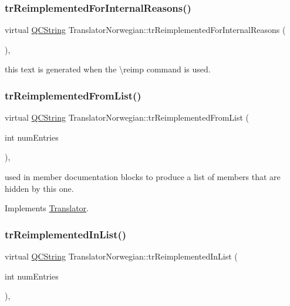 \subsubsection{\texorpdfstring{trReimplementedForInternalReasons()}{trReimplementedForInternalReasons()}}
{\footnotesize\ttfamily virtual \mbox{\hyperlink{class_q_c_string}{Q\+C\+String}} Translator\+Norwegian\+::tr\+Reimplemented\+For\+Internal\+Reasons (\begin{DoxyParamCaption}{ }\end{DoxyParamCaption})\hspace{0.3cm}{\ttfamily [inline]}, {\ttfamily [virtual]}}

this text is generated when the \textbackslash{}reimp command is used. \mbox{\label{class_translator_norwegian_a3698ea1a6022ce90bc1fdfeec9107a38}} 
\subsubsection{\texorpdfstring{trReimplementedFromList()}{trReimplementedFromList()}}
{\footnotesize\ttfamily virtual \mbox{\hyperlink{class_q_c_string}{Q\+C\+String}} Translator\+Norwegian\+::tr\+Reimplemented\+From\+List (\begin{DoxyParamCaption}\item[{int}]{num\+Entries }\end{DoxyParamCaption})\hspace{0.3cm}{\ttfamily [inline]}, {\ttfamily [virtual]}}

used in member documentation blocks to produce a list of members that are hidden by this one. 

Implements \mbox{\hyperlink{class_translator}{Translator}}.

\mbox{\label{class_translator_norwegian_a98857e9c8814edbf6902174f189431da}} 
\subsubsection{\texorpdfstring{trReimplementedInList()}{trReimplementedInList()}}
{\footnotesize\ttfamily virtual \mbox{\hyperlink{class_q_c_string}{Q\+C\+String}} Translator\+Norwegian\+::tr\+Reimplemented\+In\+List (\begin{DoxyParamCaption}\item[{int}]{num\+Entries }\end{DoxyParamCaption})\hspace{0.3cm}{\ttfamily [inline]}, {\ttfamily [virtual]}}

